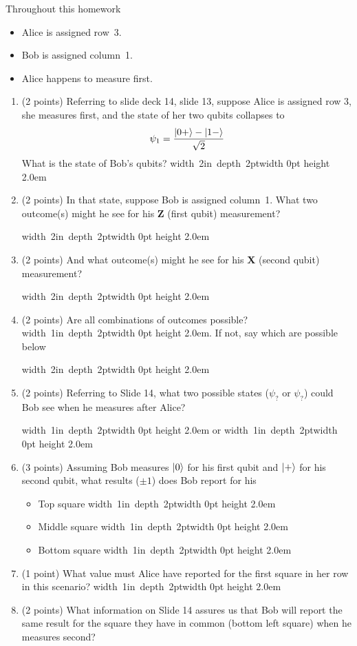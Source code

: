 \documentclass[12pt]{article}
\newcommand{\Blank}[1][1in]{\mbox{\hskip 4pt\vrule width #1 depth 2pt}\vrule width 0pt height 2.0em}
\begin{document}
Throughout this homework
\begin{itemize}
    \item Alice is assigned row~3.
    \item Bob is assigned column~1.  
    \item Alice happens to measure first.
    \end{itemize}
\begin{enumerate}[font=\bfseries]
    \item (2 points) Referring to slide deck 14, slide 13, suppose Alice is assigned row 3, she measures first, and the state of her two qubits collapses to \[ \psi_{1}=\frac{\ket{0+}-\ket{1-}}{\sqrt{2}} \]
    What is the state of Bob's qubits? \Blank[2in]
    \clearpage
    \item (2 points) In that state, suppose Bob is assigned column~1.  What two outcome(s) might he see for his \textbf{Z} (first qubit) measurement?
    
    \Blank[2in]
    \item (2 points) And what outcome(s) might he see for his \textbf{X} (second qubit) measurement?
    
    \Blank[2in]
    
    \item (2 points) Are all combinations of outcomes possible?  \Blank{}.  If not, say which are possible below
    
    \Blank[2in]{}
    \item (2 points) Referring to Slide 14, what two possible states ($\psi_{?}$ or $\psi_{?}$) could Bob see when he measures after Alice?
    
    \Blank{} or \Blank{}
    \item (3 points) Assuming Bob measures $\ket{0}$ for his first qubit and $\ket{+}$ for his second qubit, what results ($\pm 1$) does Bob report for his
    \begin{itemize}
        \item Top square \Blank{}
        \item Middle square \Blank{}
        \item Bottom square \Blank{}
    \end{itemize}
    \item (1 point) What value must Alice have reported for the first square in her row in this scenario? \Blank{}
    \clearpage
    \item (2 points) What information on Slide 14 assures us that Bob will report the same result for the square they have in common (bottom left square) when he measures second?
    
\end{enumerate}
\end{document}
